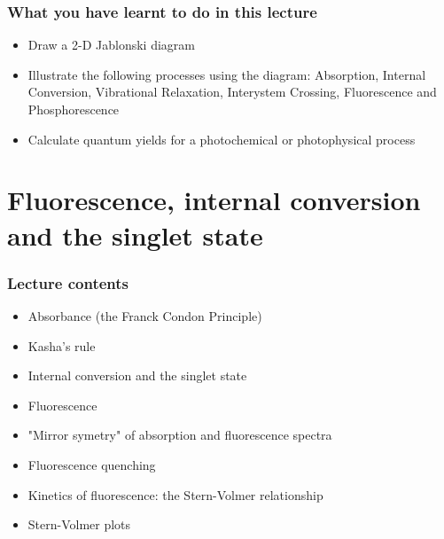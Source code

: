 \documentclass[ignorenonframetext]{beamer}
\begin{document}
\begin{frame}
\frametitle{What you have learnt to do in this lecture}
\begin{itemize}
\item Draw a 2-D Jablonski diagram
\item Illustrate the following processes using the diagram: Absorption, Internal Conversion, Vibrational Relaxation, Interystem Crossing, Fluorescence and Phosphorescence
\item Calculate quantum yields for a photochemical or photophysical process
\end{itemize}
\end{frame}


\section{Fluorescence, internal conversion and the singlet state}
	\begin{frame}
	\frametitle{Lecture contents}
		\begin{itemize}
			\item Absorbance (the Franck Condon Principle)
			\item Kasha's rule
			\item Internal conversion and the singlet state
			\item Fluorescence 
			\item "Mirror symetry" of absorption and fluorescence spectra
			\item Fluorescence quenching
			\item Kinetics of fluorescence: the Stern-Volmer relationship
			\item Stern-Volmer plots
		\end{itemize}
	\end{frame}
\end{document}
